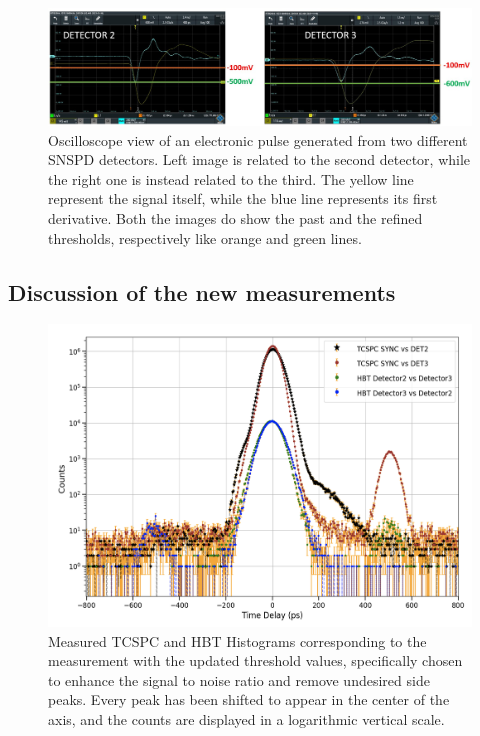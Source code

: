 \begin{figure}[hbtp]
\centering
\includegraphics[width=1\textwidth]{ScopeShots.jpg}
\caption{Oscilloscope view of an electronic pulse generated from two different SNSPD detectors. Left image is related to the second detector, while the right one is instead related to the third. The yellow line represent the signal itself, while the blue line represents its first derivative. Both the images do show the past and the refined thresholds, respectively like orange and green lines.}
\label{TrickShot}
\end{figure}

\subsection{Discussion of the new measurements}
\begin{figure}[hbtp]
\centering
\includegraphics[width=1\textwidth]{Refined.jpg}
\caption{Measured TCSPC and HBT Histograms corresponding to the measurement with the updated threshold values, specifically chosen to enhance the signal to noise ratio and remove undesired side peaks. Every peak has been shifted to appear in the center of the axis, and the counts are displayed in a logarithmic vertical scale. }
\label{RefinedMeasurement}
\end{figure}



